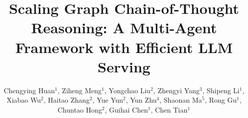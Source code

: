 \documentclass[sigconf, nonacm]{acmart}
\theoremstyle{definition}
\newcommand{\projectname}{{GLM}\xspace}
\begin{document}
\title{Scaling Graph Chain-of-Thought Reasoning: A Multi-Agent Framework with Efficient LLM Serving}

\author{
Chengying Huan$^{1}$,
Ziheng Meng$^{1}$,
Yongchao Liu$^{2}$,
Zhengyi Yang$^{3}$,
Shipeng Li$^{1}$,
Xiabao Wu$^{2}$,
Haitao Zhang$^{2}$,
Yue Yun$^{2}$,
Yun Zhu$^{4}$,
Shaonan Ma$^{5}$,
Rong Gu$^{1}$,
Chuntao Hong$^{2}$,
Guihai Chen$^{1}$,
Chen Tian$^{1}$}












\end{document}
